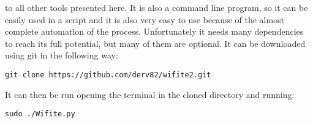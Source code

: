 to all other tools presented here. It is also a command line program, so it
can be easily used in a script and it is also very easy to use because of the
almost complete automation of the process. Unfortunately it needs many dependencies
to reach its full potential, but many of them are optional.
It can be downloaded using git in the following way:
\begin{lstlisting}[numbers=none]
    git clone https://github.com/derv82/wifite2.git
\end{lstlisting}
It can then be run opening the terminal in the cloned directory and running:
\begin{lstlisting}[numbers=none]
    sudo ./Wifite.py
\end{lstlisting}
\newpage